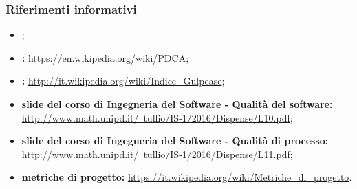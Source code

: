 	\subsubsection{Riferimenti informativi}
	\begin{itemize}
	\item \pdpv;
	\item \textbf{: }
	\href{https://en.wikipedia.org/wiki/PDCA}{https://en.wikipedia.org/wiki/PDCA};
	\item \textbf{:} 
	\href{http://it.wikipedia.org/wiki/Indice\_Gulpease}{http://it.wikipedia.org/wiki/Indice\_Gulpease};
	\item \textbf{slide del corso di Ingegneria del Software - Qualità del software:} 
	\href{http://www.math.unipd.it/~tullio/IS-1/2016/Dispense/L10.pdf}{http://www.math.unipd.it/~tullio/IS-1/2016/Dispense/L10.pdf};
	\item \textbf{slide del corso di Ingegneria del Software - Qualità di processo:}
	\href{http://www.math.unipd.it/~tullio/IS-1/2016/Dispense/L11.pdf}{http://www.math.unipd.it/~tullio/IS-1/2016/Dispense/L11.pdf};
	\item \textbf{metriche di progetto:}
	\href{https://it.wikipedia.org/wiki/Metriche\_di\_progetto}{https://it.wikipedia.org/wiki/Metriche\_di\_progetto}.
	\end{itemize}
	
